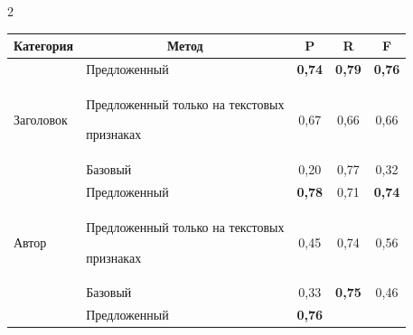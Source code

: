 \begin{multicols}{2}
\begin{table}
\begin{center}
    \begin{tabular}{|l|l|c|c|c|}


        \hline


\multicolumn{1}{|c|}{Категория}&\multicolumn{1}{c|}{Метод} &


{P} &


{R} &


{F} \\


\hline


      & 


                  {Предложенный} & \textbf{0,74}&


\textbf{0,79} &


        \textbf{0,76} \\




     {Заголовок}   & Предложенный только на текстовых 


признаках & 0,67 &


        0,66 &


        0,66 \\




        & Базовый & 0,20 &


0,77 &


    0,32 \\


        \hline


 & {Предложенный} & \textbf{0,78}&


0,71 &


    \textbf{0,74} \\




       {Автор}  & Предложенный только на текстовых 


признаках & 0,45 &


        0,74 &


        0,56 \\




        & Базовый & 0,33 &


        \textbf{0,75} &


        0,46 \\


                \hline


 &  


        {Предложенный} & \textbf{0,76} 



\end{tabular}
\end{center}
\end{table}
\end{multicols}
